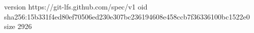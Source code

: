 version https://git-lfs.github.com/spec/v1
oid sha256:15b331f4ed80ef70506ed230e307bc236194608e458ccb7f36336100bc1522e0
size 2926
